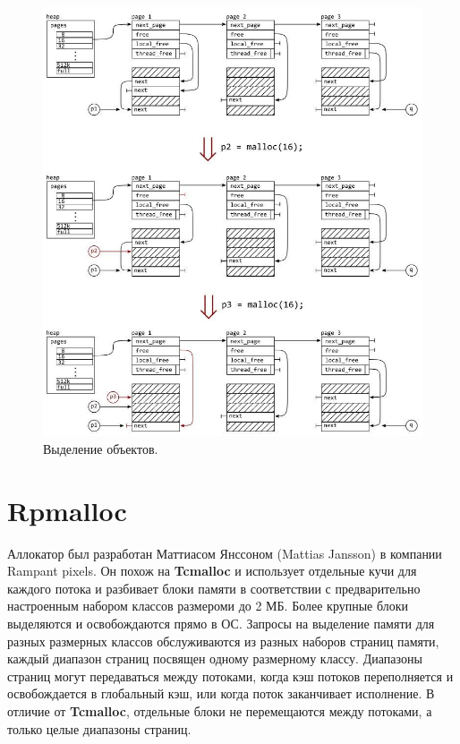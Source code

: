 \begin{figure}[!h]
	\begin{center}
		\includegraphics[scale=0.5]{images/mimalloc-alloc.jpg}
		\caption{Выделение объектов.}
		\label{mimalloc-alloc}
	\end{center}
\end{figure}

\section{Rpmalloc}\bigbreak

Аллокатор был разработан Маттиасом Янссоном (Mattias Jansson) в компании Rampant pixels. Он похож на \textbf{Tcmalloc} и использует отдельные кучи для каждого потока и разбивает блоки памяти в соответствии с предварительно настроенным набором классов размероми до 2 МБ. Более крупные блоки выделяются и освобождаются прямо в ОС. Запросы на выделение памяти для разных размерных классов обслуживаются из разных наборов страниц памяти, каждый диапазон страниц посвящен одному размерному классу. Диапазоны страниц могут передаваться между потоками, когда кэш потоков переполняется и освобождается в глобальный кэш, или когда поток заканчивает исполнение. В отличие от \textbf{Tcmalloc}, отдельные блоки не перемещаются между потоками, а только целые диапазоны страниц.\cite{rpmalloc}

